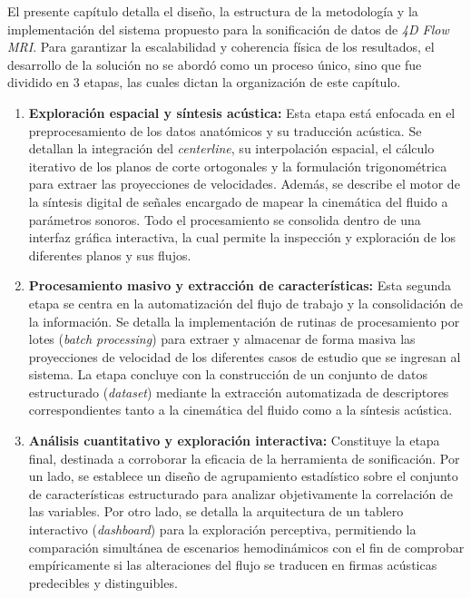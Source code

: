 \label{ch:propuesta_solucion}

El presente capítulo detalla el diseño, la estructura de la metodología y la implementación del sistema propuesto para la sonificación de datos de \textit{4D Flow MRI}. Para garantizar la escalabilidad y coherencia física de los resultados, el desarrollo de la solución no se abordó como un proceso único, sino que fue dividido en 3 etapas, las cuales dictan la organización de este capítulo.

\begin{enumerate}
    \item \textbf{Exploración espacial y síntesis acústica:} Esta etapa está enfocada en el preprocesamiento de los datos anatómicos y su traducción acústica. Se detallan la integración del \textit{centerline}, su interpolación espacial, el cálculo iterativo de los planos de corte ortogonales y la formulación trigonométrica para extraer las proyecciones de velocidades. Además, se describe el motor de la síntesis digital de señales encargado de mapear la cinemática del fluido a parámetros sonoros. Todo el procesamiento se consolida dentro de una interfaz gráfica interactiva, la cual permite la inspección y exploración de los diferentes planos y sus flujos. \label{item:etapa1}
    
    \item \textbf{Procesamiento masivo y extracción de características:} Esta segunda etapa se centra en la automatización del flujo de trabajo y la consolidación de la información. Se detalla la implementación de rutinas de procesamiento por lotes (\textit{batch processing}) para extraer y almacenar de forma masiva las proyecciones de velocidad de los diferentes casos de estudio que se ingresan al sistema. La etapa concluye con la construcción de un conjunto de datos estructurado (\textit{dataset}) mediante la extracción automatizada de descriptores correspondientes tanto a la cinemática del fluido como a la síntesis acústica. \label{item:etapa2}

    \item \textbf{Análisis cuantitativo y exploración interactiva:} Constituye la etapa final, destinada a corroborar la eficacia de la herramienta de sonificación. Por un lado, se establece un diseño de agrupamiento estadístico sobre el conjunto de características estructurado para analizar objetivamente la correlación de las variables. Por otro lado, se detalla la arquitectura de un tablero interactivo (\textit{dashboard}) para la exploración perceptiva, permitiendo la comparación simultánea de escenarios hemodinámicos con el fin de comprobar empíricamente si las alteraciones del flujo se traducen en firmas acústicas predecibles y distinguibles. \label{item:etapa3}
\end{enumerate}

